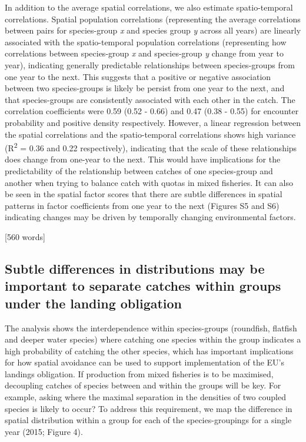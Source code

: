 \documentclass{nature}
\begin{document}
\begin{linenumbers}
In addition to the average spatial correlations, we also estimate
spatio-temporal correlations. Spatial population correlations (representing the
average correlations between pairs for species-group \textit{x} and species
group \textit{y} across all years) are linearly associated with the
spatio-temporal population correlations (representing how correlations between
species-group \textit{x} and species-group \textit{y} change from year to
year), indicating generally predictable relationships between species-groups
from one year to the next. This suggests that a positive or negative
association between two species-groups is likely be persist from one year to
the next, and that species-groups are consistently associated with each other
in the catch. The correlation coefficients were 0.59 (0.52 - 0.66) and 0.47
(0.38 - 0.55) for encounter probability and positive density respectively.
However, a linear regression between the spatial correlations and the
spatio-temporal correlations shows high variance (R\textsuperscript{2} = 0.36
and 0.22 respectively), indicating that the scale of these relationships does
change from one-year to the next. This would have implications for the
predictability of the relationship between catches of one species-group and
another when trying to balance catch with quotas in mixed fisheries. It can
also be seen in the spatial factor scores that there are subtle differences in
spatial patterns in factor coefficients from one year to the next (Figures S5
and S6) indicating changes may be driven by temporally changing environmental
factors.

[560 words]


\subsection{Subtle differences in distributions may be important to separate
	catches within groups under the landing obligation} The analysis shows
the interdependence within species-groups (roundfish, flatfish and deeper water
species) where catching one species within the group indicates a high
probability of catching the other species, which has important implications for
how spatial avoidance can be used to support implementation of the EU's
landings obligation. If production from mixed fisheries is to be maximised,
decoupling catches of species between and within the groups will be key. For
example, asking where the maximal separation in the densities of two coupled
species is likely to occur? To address this requirement, we map the difference
in spatial distribution within a group for each of the species-groupings for a
single year (2015; Figure 4). 


\end{linenumbers}
\end{document}
